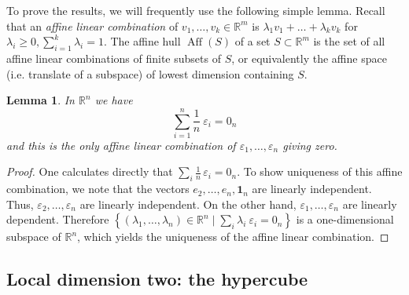 \documentclass[10pt,a4paper]{article}
\newtheorem{lem}[thm]{Lemma}\crefname{lem}{Lemma}{Lemmas}
\numberwithin{equation}{section}
\DeclareMathOperator{\aff}{Aff}
\newcommand{\RR}{\mathbb R}
\newcommand{\eps}{\varepsilon}
\newcommand{\id}{\mathbf{1}}
\begin{document}
To prove the results, we will frequently use the following simple lemma. Recall that an \emph{affine linear combination} of $v_1, \dots, v_k \in \RR^m$ is $\lambda_1 v_1 + \dots + \lambda_k v_k$ for $\lambda_i \geq 0, \sum_{i = 1}^k \lambda_i = 1$. The affine hull $\aff(S)$ of a set $S\subset \RR^m$ is the set of all affine linear combinations of finite subsets of $S$, or equivalently the affine space (i.e. translate of a subspace) of lowest dimension containing $S$.

\begin{lem}\label{lem:convCombEps-i}
In $\RR^n$ we have
\begin{equation}\label{eq:SumEps-i}
\sum_{i=1}^n \frac{1}{n} \: \varepsilon_i = 0_n 
\end{equation}
and this is the only affine linear combination of $\eps_1,\ldots,\eps_n$ giving zero.
\end{lem}

\begin{proof}
One calculates directly that $\sum_i \frac{1}{n} \, \eps_i = 0_n$. To show uniqueness of this affine combination, we note that the vectors $e_2, \ldots, e_n, \id_n$ are linearly independent. Thus, $\eps_2, \ldots, \eps_n$ are linearly independent. On the other hand, $\eps_1,\ldots, \eps_n$ are linearly dependent. Therefore
	$
	\left\lbrace (\lambda_1,\ldots,\lambda_n) \in \RR^n \mid \sum_i \lambda_i \: \eps_i = 0_n \right\rbrace
	$
is a one-dimensional subspace of $\RR^n$, which yields the uniqueness of the affine linear combination.
\end{proof}



\subsection{Local dimension two: the hypercube}\label{sec:qubits}
\end{document}
